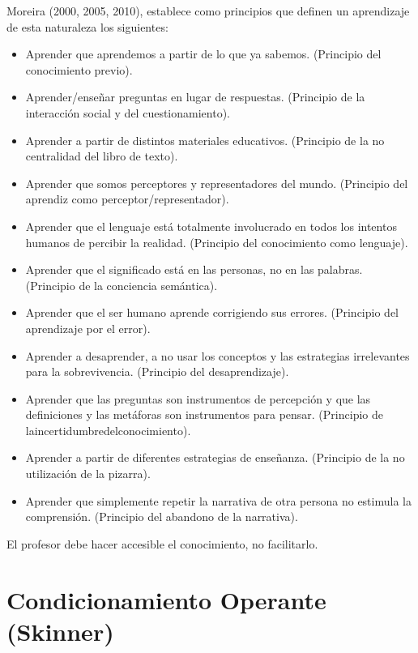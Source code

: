 \documentclass[12pt]{report}
\theoremstyle{largebreak}
\begin{document}
    Moreira (2000, 2005, 2010), establece como principios
    que definen un aprendizaje de esta naturaleza los siguientes:
    \begin{itemize}
        \item Aprender que aprendemos a partir de lo que ya sabemos. (Principio del
        conocimiento previo).
        \item Aprender/enseñar preguntas en lugar de respuestas. (Principio de la
        interacción social y del cuestionamiento).
        \item Aprender a partir de distintos materiales educativos. (Principio de la no
        centralidad del libro de texto).
        \item Aprender que somos perceptores y representadores del mundo. (Principio
        del aprendiz como perceptor/representador).
        \item Aprender que el lenguaje está totalmente involucrado en todos los intentos
        humanos de percibir la realidad. (Principio del conocimiento como
        lenguaje).
        \item Aprender que el significado está en las personas, no en las palabras.
        (Principio de la conciencia semántica).
        \item Aprender que el ser humano aprende corrigiendo sus errores. (Principio del
        aprendizaje por el error).
        \item Aprender a desaprender, a no usar los conceptos y las estrategias
        irrelevantes para la sobrevivencia. (Principio del desaprendizaje).
        \item Aprender que las preguntas son instrumentos de percepción y que las
        definiciones y las metáforas son instrumentos para pensar. (Principio de
        laincertidumbredelconocimiento).
        \item Aprender a partir de diferentes estrategias de enseñanza. (Principio de la
        no utilización de la pizarra).
        \item Aprender que simplemente repetir la narrativa de otra persona no estimula
        la comprensión. (Principio del abandono de la narrativa).
    \end{itemize}

    El profesor debe hacer accesible el conocimiento, no facilitarlo.

    \section{Condicionamiento Operante (Skinner)}
\end{document}
